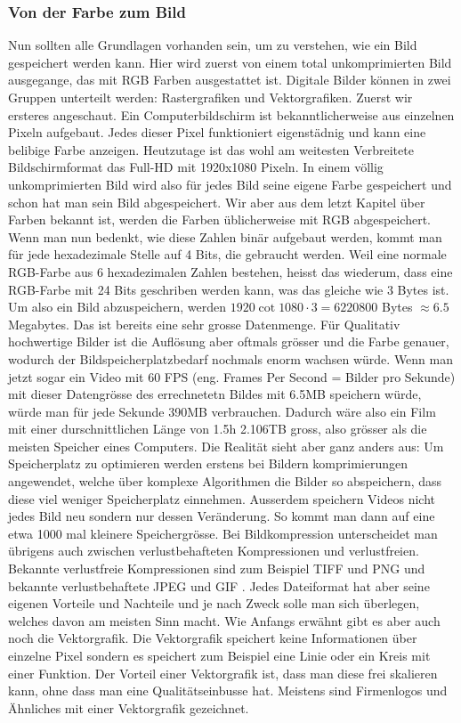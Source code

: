 \subsubsection{Von der Farbe zum Bild}
Nun sollten alle Grundlagen vorhanden sein, um zu verstehen, wie ein Bild gespeichert werden kann. Hier wird zuerst von einem total unkomprimierten Bild ausgegange, das mit RGB Farben ausgestattet ist. Digitale Bilder können in zwei Gruppen unterteilt werden: Rastergrafiken und Vektorgrafiken. Zuerst wir ersteres angeschaut. Ein Computerbildschirm ist bekanntlicherweise aus einzelnen Pixeln aufgebaut. Jedes dieser Pixel funktioniert eigenstädnig und kann eine belibige Farbe anzeigen. Heutzutage ist das wohl am weitesten Verbreitete Bildschirmformat das Full-HD mit 1920x1080 Pixeln. In einem völlig unkomprimierten Bild wird also für jedes Bild seine eigene Farbe gespeichert und schon hat man sein Bild abgespeichert. Wir aber aus dem letzt Kapitel über Farben bekannt ist, werden die Farben üblicherweise mit RGB abgespeichert. Wenn man nun bedenkt, wie diese Zahlen binär aufgebaut werden, kommt man für jede hexadezimale Stelle auf 4 Bits, die gebraucht werden. Weil eine normale RGB-Farbe aus 6 hexadezimalen Zahlen bestehen, heisst das wiederum, dass eine RGB-Farbe mit 24 Bits geschriben werden kann, was das gleiche wie 3 Bytes ist. Um also ein Bild abzuspeichern, werden $1920 \cot 1080 \cdot 3=6220800$ Bytes $ \approx  6.5$ Megabytes. Das ist bereits eine sehr grosse Datenmenge. Für Qualitativ hochwertige Bilder ist die Auflösung aber oftmals grösser und die Farbe genauer, wodurch der Bildspeicherplatzbedarf nochmals enorm wachsen würde. Wenn man jetzt sogar ein Video mit 60 FPS (eng. Frames Per Second = Bilder pro Sekunde) mit dieser Datengrösse des errechnetetn Bildes mit 6.5MB  speichern würde, würde man für jede Sekunde 390MB verbrauchen. Dadurch wäre also ein Film mit einer durschnittlichen Länge von 1.5h 2.106TB gross, also grösser als die meisten Speicher eines Computers. Die Realität sieht aber ganz anders aus: Um Speicherplatz zu optimieren werden erstens bei Bildern komprimierungen angewendet, welche über komplexe Algorithmen die Bilder so abspeichern, dass diese viel weniger Speicherplatz einnehmen. Ausserdem speichern Videos nicht jedes Bild neu sondern nur dessen Veränderung. So kommt man dann auf eine etwa 1000 mal kleinere Speichergrösse. Bei Bildkompression unterscheidet man übrigens auch zwischen verlustbehafteten Kompressionen und verlustfreien. Bekannte verlustfreie Kompressionen sind zum Beispiel TIFF und PNG und bekannte verlustbehaftete JPEG und GIF \cite{Dateiformate}. Jedes Dateiformat hat aber seine eigenen Vorteile und Nachteile und je nach Zweck solle man sich überlegen, welches davon am meisten Sinn macht. Wie Anfangs erwähnt gibt es aber auch noch die Vektorgrafik. Die Vektorgrafik speichert keine Informationen über einzelne Pixel sondern es speichert zum Beispiel eine Linie oder ein Kreis mit einer Funktion. Der Vorteil einer Vektorgrafik ist, dass man diese frei skalieren kann, ohne dass man eine Qualitätseinbusse hat. Meistens sind Firmenlogos und Ähnliches mit einer Vektorgrafik gezeichnet.
